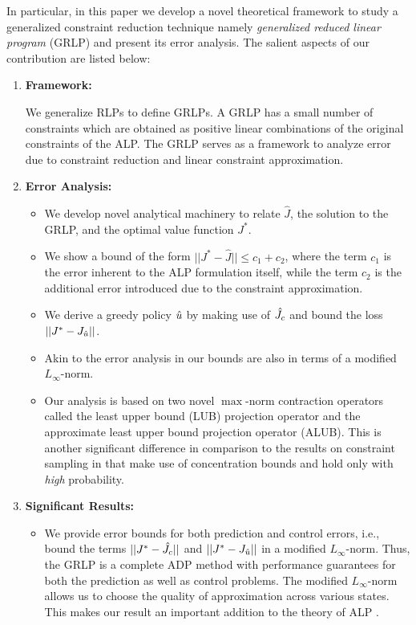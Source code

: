 In particular, in this paper we develop a novel theoretical framework to study a generalized constraint reduction technique namely \emph{generalized reduced linear program} (GRLP) and present its error analysis. The salient aspects of our contribution are listed below:
\begin{enumerate}
\item \textbf{Framework:}

We generalize RLPs to define GRLPs. A GRLP has a small number of constraints which are obtained as positive linear combinations of the original constraints of the ALP. 
The GRLP serves as a framework to analyze error due to constraint reduction and linear constraint approximation.
\item \textbf{Error Analysis:}
	\begin{itemize}
		\item We develop novel analytical machinery to relate $\hat{J}$, the solution to the GRLP, and the optimal value function $J^*$. 
		\item We show a bound of the form $||J^*-\hat{J}||\leq c_1+c_2$, 
		where the term $c_1$ is the error inherent to the ALP formulation itself, 
		while the term $c_2$ is the additional error introduced due to the constraint approximation.  
		\item We derive a greedy policy $\hat{u}$ by making use of $\hat{J}_c$ and bound the loss $||J^*-J_{\hat{u}}||$. 
		\item Akin to the error analysis in \cite{ALP,CS,SALP} our bounds are also in terms of a modified $L_\infty$-norm.
		\item Our analysis is based on two novel $\max$-norm contraction operators called the least upper bound (LUB) projection operator and the approximate least upper bound projection operator (ALUB). This is another significant difference in comparison to the results on constraint sampling in \cite{SALP,CS} that make use of concentration bounds and hold only with \emph{high} probability.
\end{itemize}
\item \textbf{Significant Results:}
	\begin{itemize}
		\item We provide error bounds for both prediction and control errors, i.e., bound the terms $||J^*-\hat{J}_c||$ and $||J^*-J_{\hat{u}}||$ in a modified $L_\infty$-norm. Thus, the GRLP is a complete ADP method with performance guarantees for both the prediction as well as control problems. The modified $L_\infty$-norm allows us to choose the quality of approximation across various states. This makes our result an important addition to the theory of ALP \cite{ALP,CS,CST,SALP}.

\end{itemize}
\end{enumerate}
